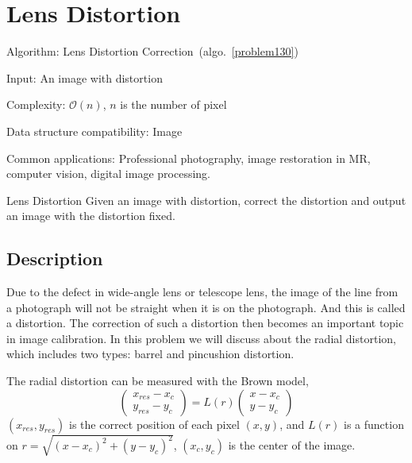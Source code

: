 \documentclass{article}
\begin{document}
\fi

%
%

\def\pbname{Lens Distortion} %

\section{\pbname} 

\begin{overview}
\item [Algorithm:] Lens Distortion Correction~(algo.~\ref{problem130}) 
\item [Input:] An image with distortion 
\item [Complexity:]$\mathcal{O}(n)$, $n$ is the number of pixel
\item [Data structure compatibility:] Image
\item [Common applications:] Professional photography, image restoration in MR, computer vision, digital image processing.
\end{overview}



\begin{problem}{\pbname}
	Given an image with distortion, correct the distortion and output an image with the distortion fixed.
\end{problem}

\subsection*{Description}
Due to the defect in wide-angle lens or telescope lens, the image of the line from a photograph will not be straight when it is on the photograph. And this is called a distortion. The correction of such a distortion then becomes an important topic in image calibration. In this problem we will discuss about the radial distortion, which includes two types: barrel and pincushion distortion.

The radial distortion can be measured with the Brown model, \begin{equation}\label{eq:1}
	\begin{pmatrix} {x}_{res}-x_c \\ {y}_{res} - y_c\end{pmatrix} = L(r) \begin{pmatrix} x- x_c \\ y- y_c\end{pmatrix}
\end{equation}
$(x_{res},y_{res})$ is the correct position of each pixel $(x,y)$, and $L(r)$ is a function on $r = \sqrt{(x-x_c)^2+(y-y_c)^2}$, $(x_c,y_c)$ is the center of the image. 
\end{document}
